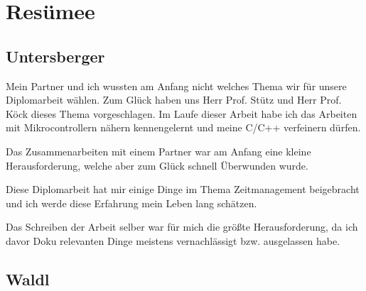 \chapter{Resümee}

\section{Untersberger}

Mein Partner und ich wussten am Anfang nicht welches Thema wir für unsere Diplomarbeit wählen. Zum Glück haben uns Herr Prof. Stütz und Herr Prof. Köck dieses Thema vorgeschlagen. Im Laufe dieser Arbeit habe ich das Arbeiten mit Mikrocontrollern nähern kennengelernt und meine C/C++ verfeinern dürfen. 

Das Zusammenarbeiten mit einem Partner war am Anfang eine kleine Herausforderung, welche aber zum Glück schnell Überwunden wurde.

Diese Diplomarbeit hat mir einige Dinge im Thema Zeitmanagement beigebracht und ich werde diese Erfahrung mein Leben lang schätzen.

Das Schreiben der Arbeit selber war für mich die größte Herausforderung, da ich davor Doku relevanten Dinge meistens vernachlässigt bzw. ausgelassen habe.

\section{Waldl}